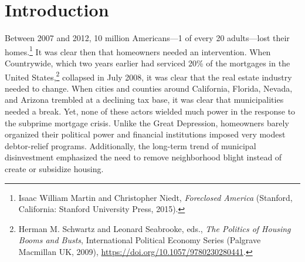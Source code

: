 \documentclass[12pt,oneside]{psthesis}
\begin{document}
\mainmatter %
\pagestyle{fancyplain} %
\doublespacing
\titleformat{\chapter}[display]{\normalfont\huge\bfseries\singlespacing}{\chaptertitlename\ \thechapter}{40pt}{\huge}
\titleformat{\section}{\singlespacing\normalfont\Large\bfseries}{\thesection}{1em}{}
\titleformat{\subsection}{\singlespacing\normalfont\large\bfseries}{\thesubsection}{1em}{}
\titleformat{\subsubsection}{\singlespacing\normalfont\normalsize\bfseries}{\thesubsubsection}{1em}{}

\hypertarget{actors-motive}{%
\chapter{Introduction}\label{actors-motive}}

Between 2007 and 2012, 10 million Americans---1 of every 20 adults---lost their homes.\footnote{Isaac William Martin and Christopher Niedt, \emph{Foreclosed America} (Stanford, California: Stanford University Press, 2015).}
It was clear then that homeowners needed an intervention.
When Countrywide, which two years earlier had serviced 20\% of the mortgages in the United States,\footnote{Herman M. Schwartz and Leonard Seabrooke, eds., \emph{The Politics of Housing Booms and Busts}, International Political Economy Series (Palgrave Macmillan UK, 2009), \url{https://doi.org/10.1057/9780230280441}.} collapsed in July 2008, it was clear that the real estate industry needed to change.
When cities and counties around California, Florida, Nevada, and Arizona trembled at a declining tax base, it was clear that municipalities needed a break.
Yet, none of these actors wielded much power in the response to the subprime mortgage crisis.
Unlike the Great Depression, homeowners barely organized their political power and financial institutions imposed very modest debtor-relief programs.
Additionally, the long-term trend of municipal disinvestment emphasized the need to remove neighborhood blight instead of create or subsidize housing.
\end{document}
